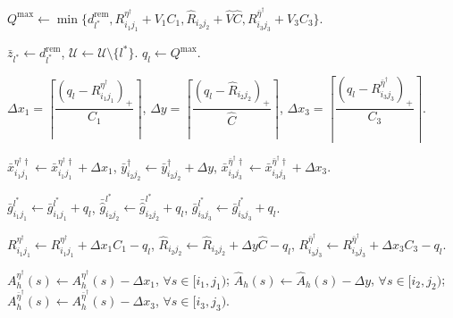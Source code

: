 \documentclass[10pt, reqno]{amsart}
\begin{document}
\begin{algorithm}[!htbp]
\begin{algorithmic}[1]
        \State 
        $Q^{\max}
        \leftarrow
        \min\{
        d_{l^*}^{\mathrm{rem}},
        R_{i_1j_1}^{\eta^\dagger}+V_1C_1,
        \widehat R_{i_2j_2}+\widehat V\widehat C,
        R_{i_3j_3}^{\bar\eta^\dagger}+V_3C_3
        \}$.

            $\bar z_{l^*}\leftarrow d_{l^*}^{\mathrm{rem}}$,
            $\mathcal U\leftarrow\mathcal U\setminus\{l^*\}$.
        \Else
            $q_l\leftarrow Q^{\max}$.

            \State 
            $\Delta x_1
            =
            \left\lceil
            \dfrac{(q_l-R_{i_1j_1}^{\eta^\dagger})_+}{C_1}
            \right\rceil$,
            $\Delta y
            =
            \left\lceil
            \dfrac{(q_l-\widehat R_{i_2j_2})_+}{\widehat C}
            \right\rceil$,
            $\Delta x_3
            =
            \left\lceil
            \dfrac{(q_l-R_{i_3j_3}^{\bar\eta^\dagger})_+}{C_3}
            \right\rceil$.

            \State 
            $\bar x_{i_1j_1}^{\eta^\dagger\dagger}
            \leftarrow
            \bar x_{i_1j_1}^{\eta^\dagger\dagger}+\Delta x_1$,
            $\bar y_{i_2j_2}^{\dagger}
            \leftarrow
            \bar y_{i_2j_2}^{\dagger}+\Delta y$,
            $\bar x_{i_3j_3}^{\bar\eta^\dagger\dagger}
            \leftarrow
            \bar x_{i_3j_3}^{\bar\eta^\dagger\dagger}+\Delta x_3$.

            \State 
            $\bar g_{i_1j_1}^{l^*}
            \leftarrow
            \bar g_{i_1j_1}^{l^*}+q_l$,
            $\bar{\widehat g}_{i_2j_2}^{l^*}
            \leftarrow
            \bar{\widehat g}_{i_2j_2}^{l^*}+q_l$,
            $\bar g_{i_3j_3}^{l^*}
            \leftarrow
            \bar g_{i_3j_3}^{l^*}+q_l$.

            \State 
            $R_{i_1j_1}^{\eta^\dagger}
            \leftarrow
            R_{i_1j_1}^{\eta^\dagger}+\Delta x_1C_1-q_l$,
            $\widehat R_{i_2j_2}
            \leftarrow
            \widehat R_{i_2j_2}+\Delta y\widehat C-q_l$,
            $R_{i_3j_3}^{\bar\eta^\dagger}
            \leftarrow
            R_{i_3j_3}^{\bar\eta^\dagger}+\Delta x_3C_3-q_l$.

            \State 
            $A_h^{\eta^\dagger}(s)
            \leftarrow
            A_h^{\eta^\dagger}(s)-\Delta x_1$,
            $\forall s\in[i_1,j_1)$;
            $\widehat A_h(s)
            \leftarrow
            \widehat A_h(s)-\Delta y$,
            $\forall s\in[i_2,j_2)$;
            $A_h^{\bar\eta^\dagger}(s)
            \leftarrow
            A_h^{\bar\eta^\dagger}(s)-\Delta x_3$,
            $\forall s\in[i_3,j_3)$.


\end{algorithmic}
\end{algorithm}
\end{document}
